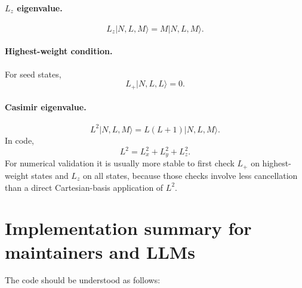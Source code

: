 \documentclass[11pt]{article}
\begin{document}
\paragraph{\(L_z\) eigenvalue.}
\[
    L_z|N,L,M\rangle=M|N,L,M\rangle .
\]

\paragraph{Highest-weight condition.}
For seed states,
\[
    L_+|N,L,L\rangle=0 .
\]

\paragraph{Casimir eigenvalue.}
\[
    L^2|N,L,M\rangle=L(L+1)|N,L,M\rangle .
\]
In code,
\[
    L^2=L_x^2+L_y^2+L_z^2.
\]
For numerical validation it is usually more stable to first check
\(L_+\) on highest-weight states and \(L_z\) on all states, because those
checks involve less cancellation than a direct Cartesian-basis application of
\(L^2\).

\section{Implementation summary for maintainers and LLMs}

The code should be understood as follows:
\end{document}

